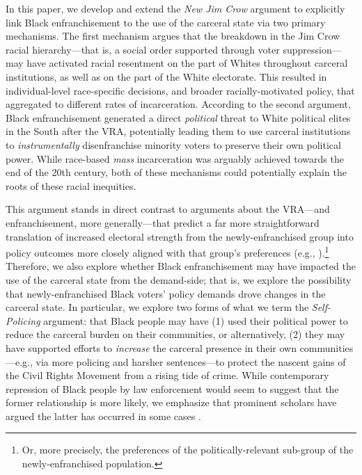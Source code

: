 \documentclass[12pt]{article}
\begin{document}
In this paper, we develop and extend the \emph{New Jim Crow} argument to explicitly link Black enfranchisement to the use of the carceral state via two primary mechanisms.  The first mechanism argues that the breakdown in the Jim Crow racial hierarchy---that is, a social order supported through voter suppression---may have activated racial resentment on the part of Whites throughout carceral institutions, as well as on the part of the White electorate.  This resulted in individual-level race-specific decisions, and broader racially-motivated policy, that aggregated to different rates of incarceration. According to the second argument, Black enfranchisement generated a direct \emph{political} threat to White political elites in the South after the VRA, potentially leading them to use carceral institutions to \emph{instrumentally} disenfranchise minority voters to preserve their own political power. While race-based \emph{mass} incarceration was arguably achieved towards the end of the 20th century, both of these mechanisms could potentially explain the roots of these racial inequities.

This argument stands in direct contrast to arguments about the VRA---and enfranchisement, more generally---that predict a far more straightforward translation of increased electoral strength from the newly-enfranchised group into policy outcomes more closely aligned with that group's preferences (e.g., \cite{Downs:1957vg}).\footnote{Or, more precisely, the preferences of the politically-relevant sub-group of the newly-enfranchised population.}  Therefore, we also explore whether Black enfranchisement may have impacted the use of the carceral state from the demand-side; that is, we explore the possibility that newly-enfranchised Black voters' policy demands drove changes in the carceral state. In particular, we explore two forms of what we term the \emph{Self-Policing} argument: that Black people may have (1) used their political power to reduce the carceral burden on their communities, or alternatively, (2) they may have supported efforts to \emph{increase} the carceral presence in their own communities---e.g., via more policing and harsher sentences---to protect the nascent gains of the Civil Rights Movement from a rising tide of crime.  While contemporary repression of Black people by law enforcement would seem to suggest that the former relationship is more likely, we emphasize that prominent scholars have argued the latter has occurred in some cases \citep{Fortner:2015uz,FormanJr:2017tz,Clegg:2018uq}.
\end{document}

